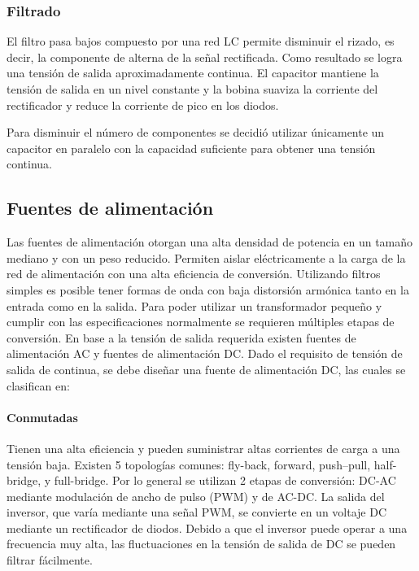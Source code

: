 \subsubsection{Filtrado}

El filtro pasa bajos compuesto por una red LC permite disminuir el rizado,
es decir, la componente de alterna de la señal rectificada. 
Como resultado se logra una tensión de salida aproximadamente continua.
El capacitor mantiene la tensión de salida en un nivel constante y
la bobina suaviza la corriente del rectificador y reduce la corriente de pico en los diodos. 

Para disminuir el número de componentes se decidió utilizar únicamente
un capacitor en paralelo con la capacidad suficiente para obtener una tensión continua.

\subsection{Fuentes de alimentación}

Las fuentes de alimentación otorgan una alta densidad de potencia en un tamaño mediano y con un peso reducido.  
Permiten aislar eléctricamente a la carga de la red de alimentación con una alta eficiencia de conversión.
Utilizando filtros simples es posible tener formas de onda con baja distorsión armónica tanto en la entrada como en la salida. 
Para poder utilizar un transformador pequeño y cumplir con las especificaciones normalmente se requieren múltiples etapas de conversión. 
En base a la tensión de salida requerida existen fuentes de alimentación AC y fuentes de alimentación DC.
Dado el requisito de tensión de salida de continua, se debe diseñar una fuente de alimentación DC, las cuales se clasifican en:

\paragraph{Conmutadas}
Tienen una alta eficiencia y pueden suministrar altas corrientes de carga a una tensión baja.
Existen 5 topologías comunes: fly-back, forward, push–pull, half-bridge, y full-bridge.
Por lo general se utilizan 2 etapas de conversión: DC-AC mediante modulación de ancho de pulso (PWM) y de AC-DC.
La salida del inversor, que varía mediante una señal PWM, se convierte en un voltaje DC mediante un rectificador de diodos. 
Debido a que el inversor puede operar a una frecuencia muy alta, las fluctuaciones en la tensión de salida de DC se pueden filtrar fácilmente.


